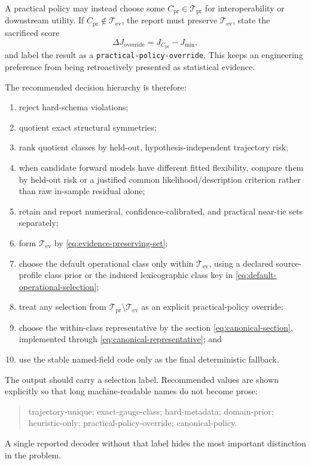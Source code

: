 \documentclass[11pt]{article}
\begin{document}
    A practical policy may instead choose some $C_{\mathrm{pr}}\in\mathcal T_{\mathrm{pr}}$
    for interoperability or downstream utility. If
    $C_{\mathrm{pr}}\notin\mathcal T_{\mathrm{ev}}$, the report must preserve
    $\mathcal T_{\mathrm{ev}}$, state the sacrificed score
    \begin{equation}
        \Delta J_{\mathrm{override}}=J_{C_{\mathrm{pr}}}-J_{\min},
    \end{equation}
    and label the result as a \texttt{practical-policy-override}. This keeps an engineering
    preference from being retroactively presented as statistical evidence.

    The recommended decision hierarchy is therefore:
    \begin{enumerate}[nosep]
    \item reject hard-schema violations;
    \item quotient exact structural symmetries;
    \item rank quotient classes by held-out, hypothesis-independent trajectory risk;
    \item when candidate forward models have different fitted flexibility, compare them
    by held-out risk or a justified common likelihood/description criterion rather
    than raw in-sample residual alone;
    \item retain and report numerical, confidence-calibrated, and practical near-tie sets
    separately;
    \item form $\mathcal T_{\mathrm{ev}}$ by \eqref{eq:evidence-preserving-set};
    \item choose the default operational class only within $\mathcal T_{\mathrm{ev}}$,
    using a declared source-profile class prior or the induced lexicographic class
    key in \eqref{eq:default-operational-selection};
    \item treat any selection from $\mathcal T_{\mathrm{pr}}\setminus
    \mathcal T_{\mathrm{ev}}$ as an explicit practical-policy override;
    \item choose the within-class representative by the section
    \eqref{eq:canonical-section}, implemented through
    \eqref{eq:canonical-representative}; and
    \item use the stable named-field code only as the final deterministic fallback.
    \end{enumerate}
    The output should carry a selection label. Recommended values are shown explicitly so
    that long machine-readable names do not become prose:
    \begin{quote}
        \small\ttfamily
        trajectory-unique; exact-gauge-class; hard-metadata; domain-prior;\\
        heuristic-only; practical-policy-override; canonical-policy.
    \end{quote}
    A single reported decoder without that label hides the most important distinction in the
    problem.
\end{document}
